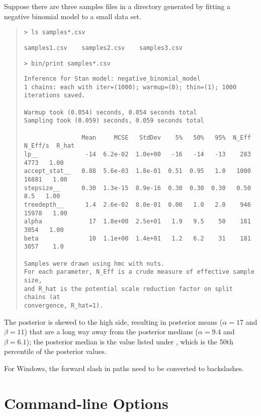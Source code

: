 Suppose there are three samples files in a directory generated by
fitting a negative binomial model to a small data set.
%
\begin{quote}
\begin{Verbatim}[fontsize=\small]
> ls samples*.csv
\end{Verbatim}
%
\begin{Verbatim}[fontshape=sl,fontsize=\small]
samples1.csv	samples2.csv	samples3.csv
\end{Verbatim}
%
\begin{Verbatim}[fontsize=\small]
> bin/print samples*.csv
\end{Verbatim}
%
{
\begin{Verbatim}[fontshape=sl,fontsize=\footnotesize]
Inference for Stan model: negative_binomial_model
1 chains: each with iter=(1000); warmup=(0); thin=(1); 1000 iterations saved.

Warmup took (0.054) seconds, 0.054 seconds total
Sampling took (0.059) seconds, 0.059 seconds total

                Mean     MCSE   StdDev    5%   50%   95%  N_Eff  N_Eff/s  R_hat
lp__             -14  6.2e-02  1.0e+00   -16   -14   -13    283     4773   1.00
accept_stat__   0.88  5.6e-03  1.8e-01  0.51  0.95   1.0   1000    16881   1.00
stepsize__      0.30  1.3e-15  8.9e-16  0.30  0.30  0.30   0.50      8.5   1.00
treedepth__      1.4  2.6e-02  8.0e-01  0.00   1.0   2.0    946    15978   1.00
alpha             17  1.8e+00  2.5e+01   1.9   9.5    50    181     3054   1.00
beta              10  1.1e+00  1.4e+01   1.2   6.2    31    181     3057    1.0

Samples were drawn using hmc with nuts.
For each parameter, N_Eff is a crude measure of effective sample size,
and R_hat is the potential scale reduction factor on split chains (at 
convergence, R_hat=1).
\end{Verbatim}
}
\end{quote}
%
The posterior is skewed to the high side, resulting in posterior means
($\alpha=17$ and $\beta=11$) that are a long way away from the posterior
medians ($\alpha=9.4$ and $\beta=6.1$);  the posterior median is the
value listed under , which is the 50th percentile of the
posterior values.

For Windows, the forward slash in paths need to be converted to backslashes.

\section{Command-line Options}

